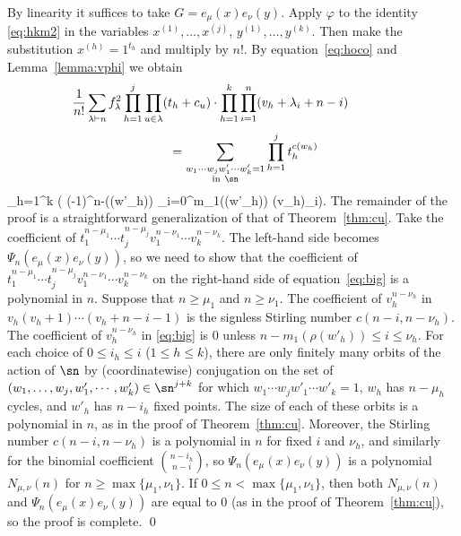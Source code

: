 \documentclass[12pt]{article}
\theoremstyle{definition}
\theoremstyle{remark}
\begin{document}
\proof
By linearity it suffices to take $G=e_\mu(x)e_\nu(y)$. Apply $\varphi$
to the identity \eqref{eq:hkm2} in the variables
$x^{(1)},\dots,x^{(j)}$, $y^{(1)},\dots,y^{(k)}$. Then make the
substitution $x^{(h)}=1^{t_h}$ and multiply by
$n!$. By equation~\eqref{eq:hoco} and Lemma~\ref{lemma:vphi} we obtain
  $$ \hspace{-.5in} \frac{1}{n!} \sum_{\lambda\vdash n} f_\lambda^2
      \prod_{h=1}^j \prod_{u\in\lambda} (t_h+c_u)\cdot
   \prod_{h=1}^k \prod_{i=1}^n (v_h+\lambda_i+n-i) $$
   $$ \qquad = 
              \sum_{\substack{w_1\cdots w_j w'_1\cdots w'_k=1\\
           \mathrm{in}\ \sn}} \prod_{h=1}^j t_h^{c(w_h)} $$
   \beq \cdot \prod_{h=1}^k \left( (-1)^{n-\ell(\rho(w'_h))}
        \sum_{i=0}^{m_1(\rho(w'_h))} 
        (v_h)_i\right). \label{eq:big} \eeq
The remainder of the proof is a straightforward generalization of that
of Theorem~\ref{thm:cu}. Take the coefficient of $t_1^{n-\mu_1}\cdots
t_j^{n-\mu_j}v_1^{n-\nu_1}\cdots v_k^{n-\nu_k}$. The left-hand side
becomes $\Psi_n(e_\mu(x)e_\nu(y))$,
so we need to show that the coefficient of $t_1^{n-\mu_1}\cdots
t_j^{n-\mu_j}v_1^{n-\nu_1}\cdots v_k^{n-\nu_k}$ on the right-hand side
of equation~\eqref{eq:big} is a polynomial in $n$.  Suppose that
$n\geq \mu_1$ and $n\geq\nu_1$. The coefficient of $v_h^{n-\nu_h}$ in
$v_h(v_h+1)\cdots (v_h+n-i-1)$ is the signless Stirling number
$c(n-i,n-\nu_h)$. The coefficient of $v_h^{n-\nu_h}$ in \eqref{eq:big}
is 0 unless $n-m_1(\rho(w'_h))\leq 
i\leq \nu_h$. For each choice of $0\leq i_h\leq i$ ($1\leq h\leq k$),
there are only finitely many orbits of the action of $\sn$ by
(coordinatewise) conjugation on the set of
$(w_1,\dots,w_j,w'_1,\cdots,w'_k)\in\sn^{j+k}$ for which $w_1\cdots
w_j w'_1\cdots w'_k=1$, $w_h$ has $n-\mu_h$ cycles, and $w'_h$ has
$n-i_h$ fixed points. The size of each of these orbits is a
polynomial in $n$, as in the proof of Theorem~\ref{thm:cu}. Moreover,
the Stirling number $c(n-i,n-\nu_h)$ is a polynomial in $n$ for fixed
$i$ and $\nu_h$, and similarly for the binomial coefficient
$\binom{n-i_h}{n-i}$, so $\Psi_n(e_\mu(x)e_\nu(y))$ is a
polynomial $N_{\mu,\nu}(n)$ for $n\geq \max\{\mu_1,\nu_1\}$.  If
$0\leq n<\max\{\mu_1,\nu_1\}$, then both $N_{\mu,\nu}(n)$ and
$\Psi_n(e_\mu(x)e_\nu(y))$ are equal to 0 (as in the proof of
Theorem~\ref{thm:cu}), so the proof is complete.  \qed
\end{document}
